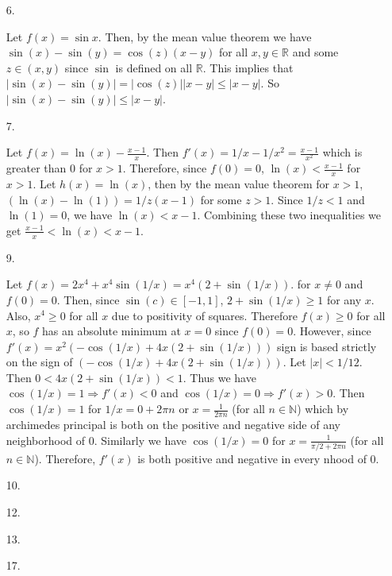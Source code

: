 \documentclass[letter paper, 11pt]{article}
\begin{document}
\begin{itemize}
\begin{itemize}
    \end{itemize}
    
    \item[6.]
    
        Let $f(x) = \sin x$. Then, by the mean value theorem we have $\sin(x)-\sin(y) = \cos(z)(x-y)$ for all $x,y\in\mathbb{R}$ and some $z \in (x,y)$ since $\sin$ is defined on all $\mathbb{R}$. This implies that $| \sin(x) - \sin(y) | = |\cos(z)||x-y| \leq |x-y|$. So $| \sin(x) - \sin(y) | \leq |x-y|$.
    
    \item[7.]
    
        Let $f(x) = \ln(x) - \frac{x-1}{x}$. Then $f'(x) = 1/x - 1/x^2 = \frac{x-1}{x^2}$ which is greater than 0 for $x>1$. Therefore, since $f(0) = 0$, $\ln(x) < \frac{x-1}{x}$ for $x>1$. Let $h(x) = \ln(x)$, then by the mean value theorem for $x>1$, $(\ln(x)-\ln(1)) = 1/z(x-1)$ for some $z>1$. Since $1/z < 1$ and $\ln(1)=0$, we have $\ln(x) < x-1$. Combining these two inequalities we get $\frac{x-1}{x} < \ln(x) < x-1$.
    
    \item[9.]
    
        Let $f(x) = 2x^4 + x^4\sin(1/x) = x^4(2 + \sin(1/x)).$ for $x\not=0$ and $f(0)= 0.$ Then, since $\sin(c) \in [-1,1]$, $2+\sin(1/x)\geq1$ for any $x$. Also, $x^4\geq 0$ for all $x$ due to positivity of squares. Therefore $f(x) \geq 0$ for all $x$, so $f$ has an absolute minimum at $x=0$ since $f(0)= 0$. However, since $f'(x) = x^2 (-\cos(1/x) + 4 x (2 + \sin(1/x)))$ sign is based strictly on the sign of $(-\cos(1/x) + 4 x (2 + \sin(1/x)))$. Let $|x| < 1/12.$ Then $0<4x(2+\sin(1/x)) < 1$. Thus we have $\cos(1/x) = 1 \Rightarrow f'(x) < 0$ and $\cos(1/x) = 0 \Rightarrow f'(x) > 0$. Then $\cos(1/x) = 1$ for $1/x = 0 + 2\pi n$ or $x = \frac{1}{2\pi n}$ (for all $n\in\mathbb{N}$) which by archimedes principal is both on the positive and negative side of any neighborhood of 0. Similarly we have $\cos(1/x) = 0$ for $x = \frac{1}{\pi/2 + 2\pi n}$ (for all $n\in\mathbb{N}$). Therefore, $f'(x)$ is both positive and negative in every nhood of 0.
    
    \item[10.]
    
        
    
    \item[12.]
    
        
    
    \item[13.]
    
        
    
    \item[17.]
    
        
    
\end{itemize}
\end{document}

